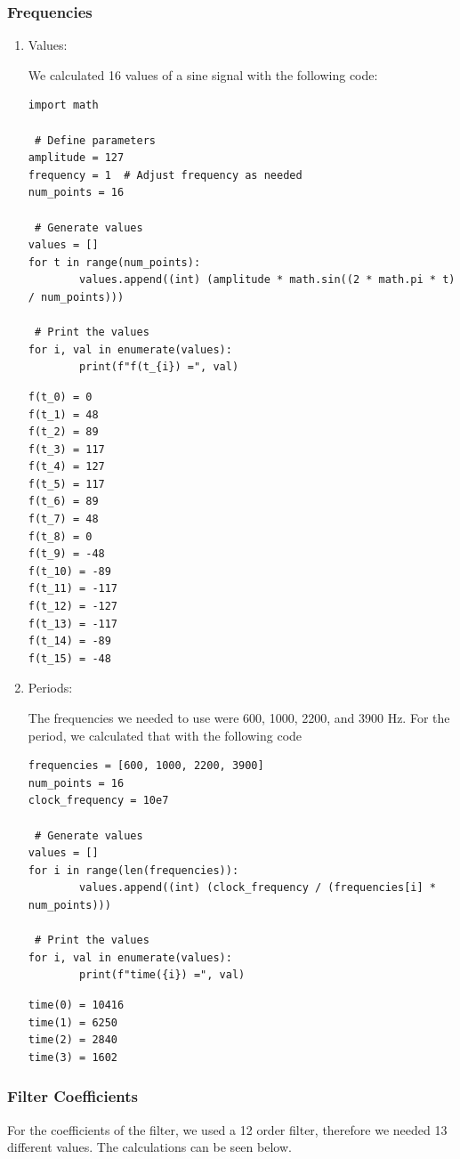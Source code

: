 \documentclass[a4paper, 12pt]{article}
\begin{document}
\subsubsection{Frequencies}
\label{sec:org085641a}
\begin{enumerate}
\item Values:
\label{sec:org3bc1def}

We calculated 16 values of a sine signal with the following code:

\begin{verbatim}
import math

 # Define parameters
amplitude = 127
frequency = 1  # Adjust frequency as needed
num_points = 16

 # Generate values
values = []
for t in range(num_points):
        values.append((int) (amplitude * math.sin((2 * math.pi * t) / num_points)))

 # Print the values
for i, val in enumerate(values):
        print(f"f(t_{i}) =", val)
\end{verbatim}

\begin{verbatim}
f(t_0) = 0
f(t_1) = 48
f(t_2) = 89
f(t_3) = 117
f(t_4) = 127
f(t_5) = 117
f(t_6) = 89
f(t_7) = 48
f(t_8) = 0
f(t_9) = -48
f(t_10) = -89
f(t_11) = -117
f(t_12) = -127
f(t_13) = -117
f(t_14) = -89
f(t_15) = -48
\end{verbatim}
\item Periods:
\label{sec:orgdd9d126}

The frequencies we needed to use were 600, 1000, 2200, and 3900 Hz. For the period, we calculated that with the following code

\begin{verbatim}
frequencies = [600, 1000, 2200, 3900]
num_points = 16
clock_frequency = 10e7

 # Generate values
values = []
for i in range(len(frequencies)):
        values.append((int) (clock_frequency / (frequencies[i] * num_points)))

 # Print the values
for i, val in enumerate(values):
        print(f"time({i}) =", val)
\end{verbatim}

\begin{verbatim}
time(0) = 10416
time(1) = 6250
time(2) = 2840
time(3) = 1602
\end{verbatim}
\end{enumerate}
\subsubsection{Filter Coefficients}
\label{sec:orgd3f8608}
For the coefficients of the filter, we used a 12 order filter, therefore we needed 13 different values. The calculations can be seen below.
\end{document}
